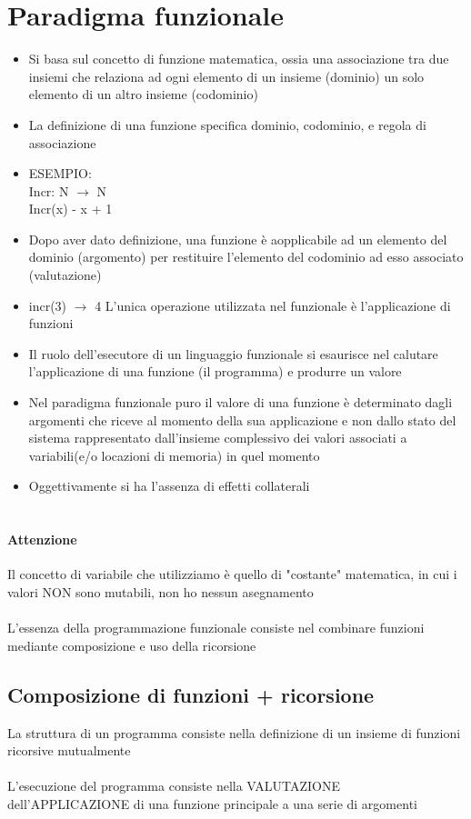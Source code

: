 \documentclass[12pt, a4paper, openany, oneside]{book}
\begin{document}
\section{Paradigma funzionale}
\begin{itemize}
	\item 
	Si basa sul concetto di funzione matematica, ossia una associazione tra due 
	insiemi che relaziona ad ogni elemento di un insieme (dominio) un solo 
	elemento di un altro insieme (codominio)
	\item La definizione di una funzione specifica dominio, codominio, e regola
	di associazione 
	\\
	\item ESEMPIO: \\
	Incr: N $\to$ N \\
	Incr(x) - x + 1
	\item Dopo aver dato definizione, una funzione è aopplicabile ad un elemento del 
	dominio (argomento) per restituire l'elemento del codominio ad esso associato
	(valutazione)
	\item incr(3) $\to$ 4 
	L'unica operazione utilizzata nel funzionale è l'applicazione di funzioni  
	\item Il ruolo dell'esecutore di un linguaggio funzionale si esaurisce nel 
	calutare l'applicazione di una funzione (il programma) e produrre un valore 
	\item Nel paradigma funzionale puro il valore di una funzione è determinato 
	dagli argomenti che riceve al momento della sua applicazione e non dallo 
	stato del sistema rappresentato dall'insieme complessivo dei valori 
	associati a variabili(e/o locazioni di memoria) in quel momento 
	\item Oggettivamente si ha l'assenza di effetti collaterali \\ \\
\end{itemize}
\paragraph{Attenzione} %
\label{par:attenzione}
Il concetto di variabile che utilizziamo è quello di "costante" matematica, in 
cui i valori NON sono mutabili, non ho nessun asegnamento
\\ \\
L'essenza della programmazione funzionale consiste nel combinare funzioni 
mediante composizione e uso della ricorsione
\subsection{Composizione di funzioni + ricorsione} 
La struttura di un programma consiste nella definizione di un insieme di 
funzioni ricorsive mutualmente
\\ \\
L'esecuzione del programma consiste nella VALUTAZIONE dell'APPLICAZIONE di una
funzione principale a una serie di argomenti
\end{document}
